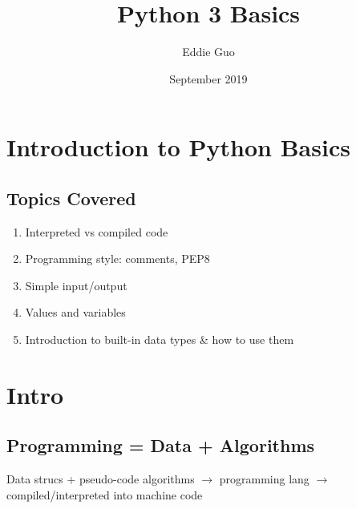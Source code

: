 \documentclass{article}
\title{Python 3 Basics}
\author{Eddie Guo}
\date{September 2019}
\begin{document}
\lstset{language=Python}

\maketitle


\section{Introduction to Python Basics}
\subsection{Topics Covered}
\begin{multicols}{2}
    \begin{enumerate}[label=(\roman*)]
        \item Interpreted vs compiled code
        \item Programming style: comments, PEP8
        \item Simple input/output
        \item Values and variables
        \item Introduction to built-in data types \& how to use them
    \end{enumerate}
\end{multicols}

\section{Intro}

\subsection{Programming = Data + Algorithms}
    Data strucs + pseudo-code algorithms $\rightarrow$  programming lang $\rightarrow$ compiled/interpreted into machine code
\end{document}
